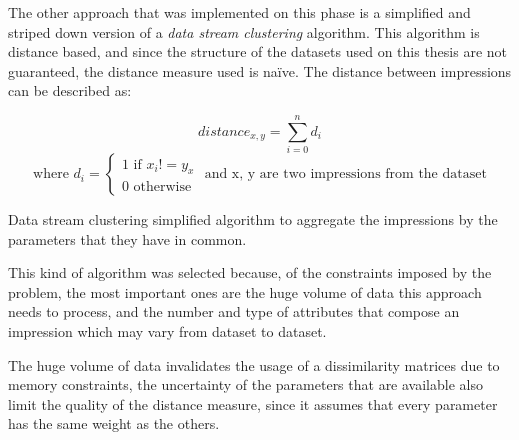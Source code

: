 The other approach that was implemented on this phase is a simplified and
striped down version of a \emph{data stream clustering} algorithm. This
algorithm is distance based, and since the structure of the datasets used on
this thesis are not guaranteed, the distance measure used is na\"{i}ve. The
distance between impressions can be described as:

\begin{center}
\begin{equation*}
  distance_{x,y}= \sum\limits_{i=0}^n d_i
\end{equation*}
\begin{equation*}
\text{where } d_i = \begin{cases} \text{1 if } x_i != y_x\\
\text{0 otherwise}\end{cases} \text{ and x, y are two impressions from the
dataset}
\end{equation*}
\end{center}

\begin{algorithm}
  \LinesNumbered
  \BlankLine

  \BlankLine

  \caption[Data stream clustering]{
    Data stream clustering simplified algorithm to aggregate the impressions by
    the parameters that they have in common.
  }
  \label{alg:pam} \end{algorithm}

This kind of algorithm was selected because, of the constraints imposed by the
problem, the most important ones are the huge volume of data this approach
needs to process, and the number and type of attributes that compose an
impression which may vary from dataset to dataset.

The huge volume of data invalidates the usage of a
dissimilarity matrices due to memory constraints, the uncertainty of the
parameters that are available also limit the quality of the distance measure,
since it assumes that every parameter has the same weight as the others.

